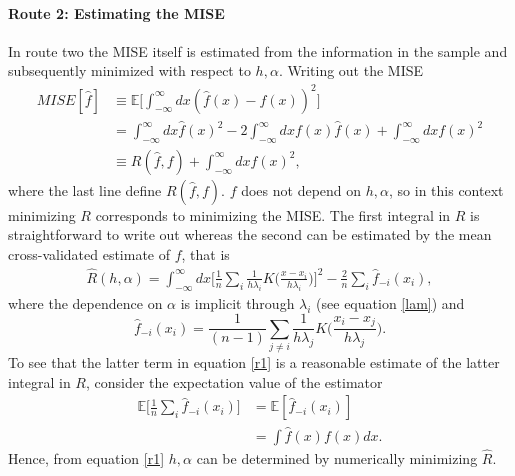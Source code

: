 \documentclass[
twoside,
openright,
titlepage,
numbers=noenddot,
headinclude,%
footinclude=true,
dottedtoc, %
ngerman,
american, %
pagesize=pdftex,
]{book}
\begin{document}
	\paragraph{Route 2: Estimating the MISE}
	In route two the MISE itself is estimated from the information in the sample and subsequently minimized with respect to $h,\alpha$. Writing out the MISE
	\begin{equation}
		\begin{split}
			MISE[\hat{f}]&\equiv \mathbb{E}\bigg[\int_{-\infty}^{\infty}dx (\hat{f}(x)-f(x))^2\bigg]\\
			&=\int_{-\infty}^{\infty}dx\hat{f}(x)^2-2\int_{-\infty}^{\infty}dxf(x)\hat{f}(x)+\int_{-\infty}^{\infty}dxf(x)^2\\
			&\equiv R(\hat{f},f)+\int_{-\infty}^{\infty}dxf(x)^2,
		\end{split}
		\label{mse4}
	\end{equation}
	where the last line define $R(\hat{f},f)$. $f$ does not depend on $h,\alpha$, so in this context minimizing $R$ corresponds to minimizing the MISE. The first integral in $R$ is straightforward to write out whereas the second can be estimated by the mean cross-validated estimate of $f$, that is~\citep{Silverman86}
	\begin{equation}
		\begin{split}
			\hat{R}(h,\alpha)=\int_{-\infty}^{\infty}dx \bigg[\frac{1}{n}\sum_{i}\frac{1}{h\lambda_i}K\bigg(\frac{x-x_i}{h\lambda_i}\bigg)\bigg]^2-\frac{2}{n}\sum_{i}\hat{f}_{-i}(x_i),
		\end{split}
		\label{r1}
	\end{equation}
	where the dependence on $\alpha$ is implicit through $\lambda_i$ (see equation \eqref{lam}) and
	\begin{equation}
		\hat{f}_{-i}(x_i)=\frac{1}{(n-1)}\sum_{j\neq i}\frac{1}{h\lambda_j}K\bigg(\frac{x_i-x_j}{h\lambda_j}\bigg).
	\end{equation}
	To see that the latter term in equation \eqref{r1} is a reasonable estimate of the latter integral in $R$, consider the expectation value of the estimator
	\begin{equation}
		\begin{split}
			\mathbb{E}\bigg[\frac{1}{n}\sum_{i}\hat{f}_{-i}(x_i)\bigg]&=\mathbb{E}[\hat{f}_{-i}(x_i)]\\
			&=\int \hat{f}(x)f(x)dx.
		\end{split}
	\end{equation}
	Hence, from equation \eqref{r1} $h,\alpha$ can be determined by numerically minimizing $\hat{R}$. 
	
\end{document}

